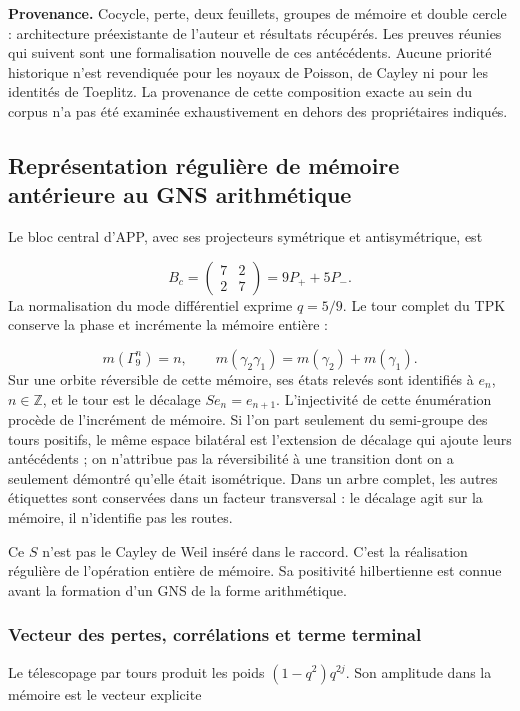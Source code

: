 \textbf{Provenance.} Cocycle, perte, deux feuillets, groupes de mémoire et double cercle : architecture préexistante de l'auteur et résultats récupérés. Les preuves réunies qui suivent sont une formalisation nouvelle de ces antécédents. Aucune priorité historique n'est revendiquée pour les noyaux de Poisson, de Cayley ni pour les identités de Toeplitz. La provenance de cette composition exacte au sein du corpus n'a pas été examinée exhaustivement en dehors des propriétaires indiqués.


\subsection{Représentation régulière de mémoire antérieure au GNS arithmétique}
\label{tm-add-m2}
Le bloc central d'APP, avec ses projecteurs symétrique et antisymétrique, est

\[
B_c=\begin{pmatrix}7&2\\2&7\end{pmatrix}
=9P_++5P_-.
\]
La normalisation du mode différentiel exprime \(q=5/9\). Le tour complet du TPK conserve la phase et incrémente la mémoire entière :

\[
m(\Gamma_9^n)=n,\qquad
m(\gamma_2\gamma_1)=m(\gamma_2)+m(\gamma_1).
\]
Sur une orbite réversible de cette mémoire, ses états relevés sont identifiés à \(e_n\), \(n\in\mathbb Z\), et le tour est le décalage \(Se_n=e_{n+1}\). L'injectivité de cette énumération procède de l'incrément de mémoire. Si l'on part seulement du semi-groupe des tours positifs, le même espace bilatéral est l'extension de décalage qui ajoute leurs antécédents ; on n'attribue pas la réversibilité à une transition dont on a seulement démontré qu'elle était isométrique. Dans un arbre complet, les autres étiquettes sont conservées dans un facteur transversal : le décalage agit sur la mémoire, il n'identifie pas les routes.

Ce \(S\) n'est pas le Cayley de Weil inséré dans le raccord. C'est la réalisation régulière de l'opération entière de mémoire. Sa positivité hilbertienne est connue avant la formation d'un GNS de la forme arithmétique.


\subsubsection{Vecteur des pertes, corrélations et terme terminal}
\label{tm-add-m2-1}
Le télescopage par tours produit les poids \((1-q^2)q^{2j}\). Son amplitude dans la mémoire est le vecteur explicite

